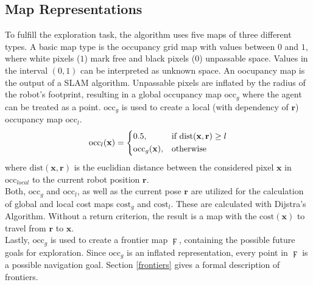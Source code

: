 \documentclass[twocolumn]{svjour3}[2016]
\begin{document}
\subsection{Map Representations}
To fulfill the exploration task, the algorithm uses five maps of three different types. A basic map type is the occupancy grid map with values between $0$ and $1$, where white pixels ($1$) mark free and black pixels ($0$) unpassable space. Values in the interval $(0,1)$ can be interpreted as unknown space. An oocupancy map is the output of a SLAM algorithm. Unpassable pixels are inflated by the radius of the robot's footprint, resulting in a global occupancy map $\textrm{occ}_g$ where the agent can be treated as a point. $\textrm{occ}_g$ is used to create a local (with dependency of $\textbf{r}$) occupancy map $\textrm{occ}_{l}$.
\begin{equation}
\textrm{occ}_ {l}(\textbf{x})=
\begin{dcases}
0.5, & \text{if } \textrm{dist}(\textbf{x}, \textbf{r}) \geq l\\
\textrm{occ}_{g}(\textbf{x}), & \text{otherwise}
\end{dcases}
\end{equation}
where $\textrm{dist}(\textbf{x}, \textbf{r})$ is the euclidian distance between the considered pixel $\textbf{x}$ in $\textrm{occ}_{local}$ to the current robot position $\textbf{r}$.
\\
Both, $\textrm{occ}_{g}$ and $\textrm{occ}_{l}$, as well as the current pose $\textbf{r}$ are utilized for the calculation of global and local cost maps $\textrm{cost}_{g}$ and $\textrm{cost}_{l}$. These are calculated with Dijstra's Algorithm. Without a return criterion, the result is a map with the $\textrm{cost}(\textbf{x})$ to travel from $\textbf{r}$ to $\textbf{x}$.\\
Lastly, $\textrm{occ}_g$ is used to create a frontier map $\digamma$, containing the possible future goals for exploration. Since $\textrm{occ}_g$ is an inflated representation, every point in $\digamma$ is a possible navigation goal. Section \ref{frontiers} gives a formal description of frontiers.
\end{document}
